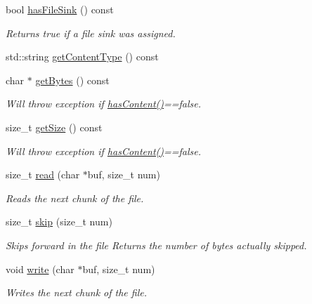 \begin{DoxyCompactItemize}
bool \hyperlink{classBUSBOY_1_1DataFile_a08b8fa0766abdebdc757bb493658eadf}{hasFileSink} () const 
\begin{DoxyCompactList}\small\item\em Returns true if a file sink was assigned. \item\end{DoxyCompactList}\item 
std::string \hyperlink{classBUSBOY_1_1DataFile_a76a0325c8a1f8be6bf74ed077522e6ec}{getContentType} () const 
\item 
char $\ast$ \hyperlink{classBUSBOY_1_1DataFile_a45fde9d4a579facec44247df8d15aaff}{getBytes} () const 
\begin{DoxyCompactList}\small\item\em Will throw exception if \hyperlink{classBUSBOY_1_1DataFile_aa127c5ce6db57b3e35151a2c44404f0a}{hasContent()}==false. \item\end{DoxyCompactList}\item 
size\_\-t \hyperlink{classBUSBOY_1_1DataFile_a13be7facfe1635e78e148da160b9f5a8}{getSize} () const 
\begin{DoxyCompactList}\small\item\em Will throw exception if \hyperlink{classBUSBOY_1_1DataFile_aa127c5ce6db57b3e35151a2c44404f0a}{hasContent()}==false. \item\end{DoxyCompactList}\item 
size\_\-t \hyperlink{classBUSBOY_1_1DataFile_a104c0a452496118e024a1c5f1a68753b}{read} (char $\ast$buf, size\_\-t num)
\begin{DoxyCompactList}\small\item\em Reads the next chunk of the file. \item\end{DoxyCompactList}\item 
size\_\-t \hyperlink{classBUSBOY_1_1DataFile_a6fbe7dc10df61744c7a11ea80be709d8}{skip} (size\_\-t num)
\begin{DoxyCompactList}\small\item\em Skips forward in the file Returns the number of bytes actually skipped. \item\end{DoxyCompactList}\item 
void \hyperlink{classBUSBOY_1_1DataFile_a1dc9c082abb0c99f0f0354c71c6754c3}{write} (char $\ast$buf, size\_\-t num)
\begin{DoxyCompactList}\small\item\em Writes the next chunk of the file. \item\end{DoxyCompactList}\item 

\end{DoxyCompactItemize}
